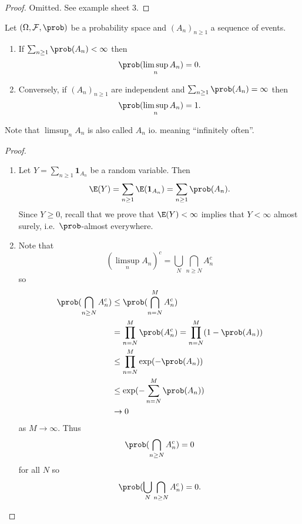 \documentclass[a4paper]{article}
\renewcommand{\P}{\prob} %
\begin{document}
\begin{proof}
  Omitted. See example sheet 3.
\end{proof}

\begin{lemma}
  Let \((\Omega, \mathcal F, \P)\) be a probability space and \((A_n)_{n \geq 1}\) a sequence of events.
  \begin{enumerate}
  \item If \(\sum_{n \geq 1} \P(A_n) < \infty\) then
    \[
      \P(\limsup_n A_n) = 0.
    \]
  \item Conversely, if \((A_n)_{n \geq 1}\) are independent and \(\sum_{n \geq 1} \P(A_n) = \infty\) then
    \[
      \P(\limsup_n A_n) = 1.
    \]
  \end{enumerate}
\end{lemma}

Note that \(\limsup_n A_n\) is also called \(A_n\) io. meaning ``infinitely often''.

\begin{proof}\leavevmode
  \begin{enumerate}
  \item Let \(Y = \sum_{n \geq 1} \mathbf 1_{A_n}\) be a random variable. Then
    \[
      \E(Y) = \sum_{n \geq 1} \E(\mathbf 1_{A_n}) = \sum_{n \geq 1} \P(A_n).
    \]
    Since \(Y \geq 0\), recall that we prove that \(\E(Y) < \infty\) implies that \(Y < \infty\) almost surely, i.e.\ \(\P\)-almost everywhere.
  \item Note that
    \[
      (\limsup_n A_n)^c = \bigcup_N \bigcap_{n \geq N} A_n^c
    \]
    so
    \begin{align*}
      \P(\bigcap_{n \geq N} A_n^c)
      &\leq \P(\bigcap_{n = N}^M A_n^c) \\
      &= \prod_{n = N}^M \P(A_n^c)
      = \prod_{n = N}^M (1 - \P(A_n)) \\
      &\leq \prod_{n = N}^M \exp (-\P(A_n)) \\
      &\leq \exp (- \sum_{n = N}^M \P(A_n)) \\
      &\to 0
    \end{align*}
    as \(M \to \infty\). Thus
    \[
      \P(\bigcap_{n \geq N} A_n^c) = 0
    \]
    for all \(N\) so
    \[
      \P(\bigcup_N \bigcap_{n \geq N} A_n^c) = 0.
    \]
  \end{enumerate}
\end{proof}
\end{document}
